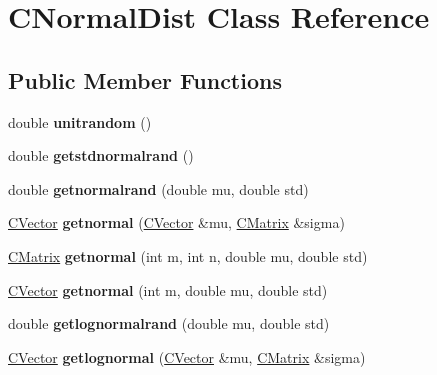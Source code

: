 \hypertarget{class_c_normal_dist}{}\section{C\+Normal\+Dist Class Reference}
\label{class_c_normal_dist}
\subsection*{Public Member Functions}
\begin{DoxyCompactItemize}
\item 
\mbox{\label{class_c_normal_dist_a9e09d930af9ee6d4198ce6478edcaa8a}} 
double {\bfseries unitrandom} ()
\item 
\mbox{\label{class_c_normal_dist_a4cf129e5e0bc87a8cbaac8f069e58290}} 
double {\bfseries getstdnormalrand} ()
\item 
\mbox{\label{class_c_normal_dist_a7ff15b1f07440567e8d9d3fd2e2c266c}} 
double {\bfseries getnormalrand} (double mu, double std)
\item 
\mbox{\label{class_c_normal_dist_afda18d52fd25eb9a73128614ec23479d}} 
\hyperlink{class_c_vector}{C\+Vector} {\bfseries getnormal} (\hyperlink{class_c_vector}{C\+Vector} \&mu, \hyperlink{class_c_matrix}{C\+Matrix} \&sigma)
\item 
\mbox{\label{class_c_normal_dist_a767d6708f78db3040bef94312883826e}} 
\hyperlink{class_c_matrix}{C\+Matrix} {\bfseries getnormal} (int m, int n, double mu, double std)
\item 
\mbox{\label{class_c_normal_dist_ac03652df4b04897713671e18cf2c51b1}} 
\hyperlink{class_c_vector}{C\+Vector} {\bfseries getnormal} (int m, double mu, double std)
\item 
\mbox{\label{class_c_normal_dist_a32d8a7c5e48df3b0b01060aac7c99c27}} 
double {\bfseries getlognormalrand} (double mu, double std)
\item 
\mbox{\label{class_c_normal_dist_a5286b4f0dc862295dd09c6b6c4260919}} 
\hyperlink{class_c_vector}{C\+Vector} {\bfseries getlognormal} (\hyperlink{class_c_vector}{C\+Vector} \&mu, \hyperlink{class_c_matrix}{C\+Matrix} \&sigma)

\end{DoxyCompactItemize}
